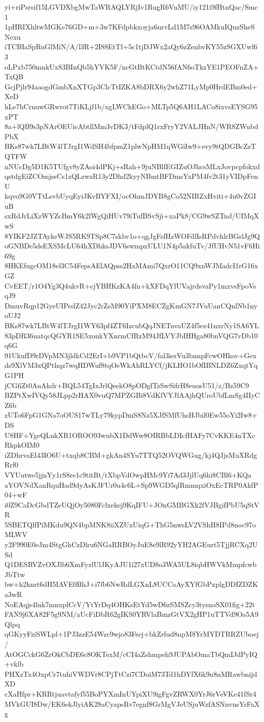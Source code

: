 yi+riPsrsif15LGVDXbgMwTaWRAQLYRjIv1RugR6VnMU/iy121i9fHtnQac/Smc1
1pHRIXhltwMGKe76GD+m+3w7KFdpbkxoyja6nrvLd1M7s96OAMkuIQuzSheSNexu
iTCBIaSpRuGlMiN/A/l3R+2I88EtTf+5c1tjDJWx2aQy6zZenbvKY55zSGXUwl63
oLPxb750mnkUx83BInQb5hYVK5F/ncGtBtKCtdN56fAN6oTkzYE1PEOFnZA+TxQB
GcjPjlr94aaogdGmbXnXTGp3ClcTtIZKA8bDRX6y2whZ71LyMp0HrdEBm0ed+XeD
hLe7hCrnuwGRwrot7TiKLjf1b/xgLWCkEGo+MLTp5Q6AH1LACo8ixvsEYSG95xPT
8a+lQB9s3pNArOEUieAbtllMm3vDK3/tFdplQ1rxFryY2VALJHnN/WR8ZWubdPbX
BKs87wk7LBtW4lTJrgI1WdSH4bfpmZ1plwNpHM1qWGiIw9+evy9tQDGBcZzTQTFW
nNUcDg5D1K5TUfgv8yZAoi4dPKj+sRah+9juNBlfEGIZuOJhcsMLxJovpcpfokxd
qstdgEiZCOmjssCs1zQLzwzR13y2Dhd2kyyNBmtBFDmsYxPM4fv2t31yVIDpFenU
kqvo9G0VTtLsvbUyqEyiJKvBYFXI/ocOhmJDYB8gCo52NIRZxHviti+4u0vZGIuB
sxRdJrLiXzWYZcBmY6k2lWgQiHUv79iTufBSvSji+xaPk8/CG9wSZTnd/UIMqXwS
8YIKF2JZTAykeWJS5RK9TSp8C7skbv1o+qgJgFsfHzWOFdlIsRPdvhlrBGslJg9Q
oGNBDe5dsEXSMcLU64hXDhksJDV6swmpxULU1N4p5akfuTv/JfUHvN51vF6Hi69g
8HKEfugcOM18el3C54FepsAElAQpss2HxMAmi7QxrO11CQ9xnWJMadcI1rG16xGZ
CvEET/r1O4Yg3Q4ukvR+cjYBHKzKA4fn+kXFDqYfUVajrdsvaPy1mxvsFpoVsqJ9
DmuvRqp12GyeUIPedZ42Jyc2rZsM90YiPXM8ECZgKmGN7JVuUanCQnlNb1nyoUJ2
BKs87wk7LBtW4lTJrgI1WY63pf4ZT6IzcubQqJNETnvaUZ4f5ez41nxrNy1SA6YL
83pDR36uatqcQGYR1SE5xonkYXnrmCfRzM94JfLVYJbIHHga80bnVQG7vDb10q6G
91UkufD9rDVpMN3jldkCd2ErI+b9VP1bQtbcV/fal3ierVu3bnnpFcwOHkov+Gex
ds9XlVM3xQPthqz7wqHDWuf8tqOeWkAhRLYCf/jKLHO1bOfIBNLDZ6ZxqtYqG1PH
jCGfiZt0AuAkdr+BQL54TgIxJrlQeekO8pODgfTzSwSifrH8euosU51/z/Bz59C9
BZPtXwIVQy58JLpp2rHAX0vuQ7MPZGBi8VdKfVYJlAAjhQUroUbfLmSg4IIyCZ6b
zUTo6FpG1GNa7oOUS17wTLy79kypDmS8Nz5XJfSMfUhsHJbil0Ew55oYi2Iw8+DS
U8HF+YgeQLukXR1OROO93wubX1DdWw8OIRBbLDIcfHAFy7CvKKE4nTXcRkpkOIM0
iZDhrvaEl43IO6U+txqb8CBM+gkAn4SYu7TTQ52OVQWGug/kj4QJjsMuXRdgRrf0
VYUutwe5jjnYy1rS8re1c9titRt/tXbpVdOwpHMc9Yi7Ad3JjlUq6hi8CBl6+KQa
aYOVNdXanRquHad9dyAsKJFUr0u4c6L+Sp9WGD5qlRmmqxiOxEcTRP0AkfP04+wF
i0Z9CaDcGbdTZeUQjOy5080Fclxekej9KqIFU+JOnGMBGXk2fVJBgifPbU5qStVR
5SBETQlfPiMKdu9QN4bpMNK8iiXZUxUiqG+ThG5nwsLV2VShH8IPd8noc97oMLWV
y2F990E0eJm4StgGhCzDlru6NGaRRBOyJuE8e9lR92yYH2AGEurt5TjjRCXq2USd
Q1DESRVZvOXJlb6XmFyzlUlJKyAJU1i27xUD8o3WA5UL8iqbHWVkMmpfcwbJbTtw
bw+h2knrt6dH5IAVE0BhJ+i7fb6NwRdLGXnL8UCCaAyXYfGbPxplgDDIZDZKa3wR
NoEAqjs4lnk7mnxplCcV/YtYrDq4OHKsEtYd5wD6zSMSZcy3tysnoSX01fig+22t
FAN9j6XA82F5g9NM/aUcFiDbR62gIKS0YRVlaBmzGtVX2gHP1uTTVd9Oa5A9Qlpq
qGKyyFziSWLpl+1PJ3zzE54Wzc9wjo83Fsej+bkZrfud8npM8YrMYDTRRZUboej/
AtOGCckG6ZrOkCbDE6c8OKTexM/cCI4aZshmpeh9JUPAbOmaTbQmIJdPyIQ+vklb
PHXzTx4OxpCr7tuhiVWDVr8CPjTtCzi7CDoiM73Td1hDYfX6k9n8nMRawbnijdXD
cXaHfpr+KRRtjuavtafyf55BoPYXmInUYpiXU9igFgvZRWX0YrJ6rVeVKe41fSr4
MVkGUI8Dw/EK6ekJlyiAK28aCyapsRv7egnf8GrMgVJeUSjuWzfASNnvnsYrFaXg
